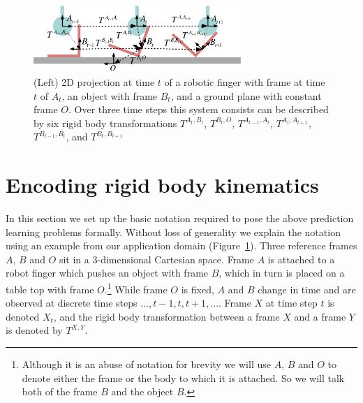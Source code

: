\begin{figure}[t!]
\centerline{\includegraphics[width=0.7\textwidth]{sequential-frames}}
\caption[Setup1]{(Left) 2D projection at time $t$ of a robotic finger with frame at time $t$ of $A_{t}$,
an object with frame $B_{t}$, and a ground plane with constant frame
$O$. Over three time steps this system consists can be described by six rigid body transformations $T^{A_t, B_t}$, $T^{B_t, O}$, $T^{A_{t-1}, A_{t}}$, $T^{A_{t}, A_{t+1}}$, $T^{B_{t-1}, B_{t}}$, and $T^{B_{t}, B_{t+1}}$}
\label{fig:Learning.setup1}
\end{figure}

\section{Encoding rigid body kinematics}
\label{sec:Representations}

In this section we set up the basic notation required to pose the
above prediction learning problems formally. Without loss of generality we explain the notation using an example from our application domain
(Figure~\ref{fig:Learning.setup1}). Three reference frames $A$, $B$
and $O$ sit in a $3$\nobreakdash-\hspace{0pt}dimensional Cartesian
space. Frame $A$ is attached to a robot finger which pushes an object with frame $B$, which in turn is placed on a table top with frame
$O$.\footnote{Although it is an abuse of notation for brevity we will
  use $A$, $B$ and $O$ to denote either the frame or the body to which  it is attached. So we will talk both of the frame $B$ and the object $B$.} While frame $O$ is fixed, $A$ and $B$ change in time and are observed at discrete time steps $..., t-1, t, t+1, ...$.  Frame $X$ at
time step $t$ is denoted $X_t$, and the rigid body transformation
between a frame $X$ and a frame $Y$ is denoted by $T^{X, Y}$.

